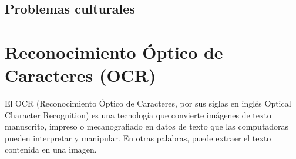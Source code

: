 \subsection{Problemas culturales}\label{ErrorCultura}



\section{Reconocimiento Óptico de Caracteres (OCR)}
El OCR (Reconocimiento Óptico de Caracteres, por sus siglas en inglés Optical Character Recognition) es una tecnología que convierte imágenes de texto manuscrito, impreso o mecanografiado en datos de texto que las computadoras pueden interpretar y manipular. En otras palabras, puede extraer el texto contenida en una imagen.

